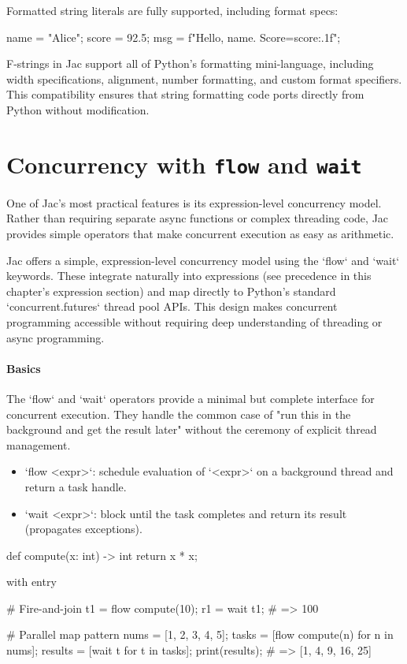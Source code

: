 Formatted string literals are fully supported, including format specs:

\begin{jacblock}
name = "Alice"; score = 92.5;
msg = f"Hello, {name}. Score={score:.1f}";
\end{jacblock}

F-strings in Jac support all of Python's formatting mini-language, including width specifications, alignment, number formatting, and custom format specifiers. This compatibility ensures that string formatting code ports directly from Python without modification.

\section{Concurrency with \texttt{flow} and \texttt{wait}}

One of Jac's most practical features is its expression-level concurrency model. Rather than requiring separate async functions or complex threading code, Jac provides simple operators that make concurrent execution as easy as arithmetic.

Jac offers a simple, expression-level concurrency model using the `flow` and `wait` keywords. These integrate naturally into expressions (see precedence in this chapter's expression section) and map directly to Python's standard `concurrent.futures` thread pool APIs. This design makes concurrent programming accessible without requiring deep understanding of threading or async programming.

\paragraph{Basics}

The `flow` and `wait` operators provide a minimal but complete interface for concurrent execution. They handle the common case of "run this in the background and get the result later" without the ceremony of explicit thread management.

\begin{itemize}
    \item `flow <expr>`: schedule evaluation of `<expr>` on a background thread and return a task handle.
    \item `wait <expr>`: block until the task completes and return its result (propagates exceptions).
\end{itemize}

\begin{jacblock}
def compute(x: int) -> int { return x * x; }

with entry {
    # Fire-and-join
    t1 = flow compute(10);
    r1 = wait t1;          # => 100

    # Parallel map pattern
    nums   = [1, 2, 3, 4, 5];
    tasks  = [flow compute(n) for n in nums];
    results = [wait t for t in tasks];
    print(results);        # => [1, 4, 9, 16, 25]
}
\end{jacblock}

